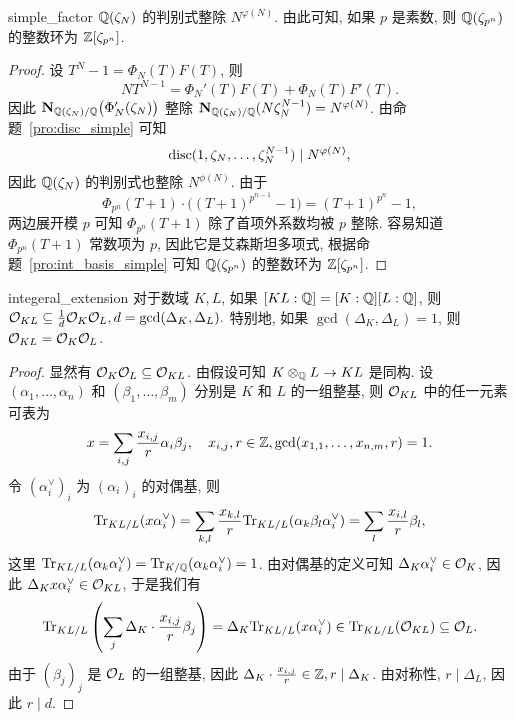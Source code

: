 \begin{proposition}{}{simple_factor}
${\mathbb{Q}}(\zeta_N)$ 的判别式整除 $N^{\varphi(N)}$. 由此可知, 如果 $p$ 是素数, 则 ${\mathbb{Q}}(\zeta_{p^n})$ 的整数环为 ${\mathbb{Z}}[\zeta_{p^n}]$.
\end{proposition}
\begin{proof}
设 $T^N-1=\Phi_N(T)F(T)$, 则
  \[NT^{N-1}=\Phi_N'(T)F(T)+\Phi_N(T)F'(T).\]
因此 ${\mathbf{N}}_{{\mathbb{Q}}(\zeta_N)/{\mathbb{Q}}}\bigl(\Phi'_N(\zeta_N)\bigr)$ 整除 ${\mathbf{N}}_{{\mathbb{Q}}(\zeta_N)/{\mathbb{Q}}}(N\zeta_N^{N-1})=N^{\varphi(N)}$. 由命题~\ref{pro:disc_simple} 可知 
	\[{\mathrm{disc}}(1,\zeta_N,\dots,\zeta_N^{N-1})\mid N^{\varphi(N)},\] 
因此 ${\mathbb{Q}}(\zeta_N)$ 的判别式也整除 $N^{\phi(N)}$. 由于
  \[\Phi_{p^n}(T+1)\cdot \bigl((T+1)^{p^{n-1}}-1\bigr)=(T+1)^{p^n}-1,\]
两边展开模 $p$ 可知 $\Phi_{p^n}(T+1)$ 除了首项外系数均被 $p$ 整除. 容易知道 $\Phi_{p^n}(T+1)$ 常数项为 $p$, 因此它是艾森斯坦多项式, 根据命题~\ref{pro:int_basis_simple} 可知 ${\mathbb{Q}}(\zeta_{p^n})$ 的整数环为 ${\mathbb{Z}}[\zeta_{p^n}]$.
\end{proof}


\begin{lemma}{}{integeral_extension}
对于数域 $K, L$, 如果 $[KL:{\mathbb{Q}}]=[K:{\mathbb{Q}}][L:{\mathbb{Q}}]$, 则 ${\mathcal{O}}_{KL}\subseteq \frac{1}{d}{\mathcal{O}}_K{\mathcal{O}}_L, d=\gcd(\Delta_K,\Delta_L).$ 特别地, 如果 $\gcd(\Delta_K,\Delta_L)=1$, 则 ${\mathcal{O}}_{KL}={\mathcal{O}}_K{\mathcal{O}}_L$.
\end{lemma}
\begin{proof}
显然有 ${\mathcal{O}}_K{\mathcal{O}}_L\subseteq {\mathcal{O}}_{KL}$.
由假设可知 $K\otimes_{\mathbb{Q}} L\to KL$ 是同构. 设 $(\alpha_1,\dots,\alpha_n)$ 和 $(\beta_1,\dots,\beta_m)$ 分别是 $K$ 和 $L$ 的一组整基, 则 ${\mathcal{O}}_{KL}$ 中的任一元素可表为
  \[x=\sum_{i,j}\frac{x_{i,j}}{r}\alpha_i\beta_j,\quad x_{i,j},r\in{\mathbb{Z}}, \gcd(x_{1,1},\dots,x_{n,m},r)=1.\]
令 $(\alpha_i^\vee)_i$ 为 $(\alpha_i)_i$ 的对偶基, 则
  \[{\mathrm{Tr}}_{KL/L}(x\alpha_i^\vee)=\sum_{k,l}\frac{x_{k,l}}{r}{\mathrm{Tr}}_{KL/L}(\alpha_k\beta_l\alpha_i^\vee)
    =\sum_l \frac{x_{i,l}}{r}\beta_l,\]
这里 ${\mathrm{Tr}}_{KL/L}(\alpha_k\alpha_i^\vee)={\mathrm{Tr}}_{K/{\mathbb{Q}}}(\alpha_k\alpha_i^\vee)=1$.
由对偶基的定义可知 $\Delta_K\alpha_i^\vee\in{\mathcal{O}}_K$, 因此 $\Delta_Kx\alpha_i^\vee\in{\mathcal{O}}_{KL}$, 于是我们有
  \[{\mathrm{Tr}}_{KL/L}\left(\sum_j\Delta_K\cdot \frac{x_{i,j}}{r}\beta_j\right)=\Delta_K{\mathrm{Tr}}_{KL/L}(x\alpha_i^\vee)\in{\mathrm{Tr}}_{KL/L}({\mathcal{O}}_{KL})\subseteq{\mathcal{O}}_L.\]
由于 $(\beta_j)_j$ 是 ${\mathcal{O}}_L$ 的一组整基, 因此 $\Delta_K\cdot \frac{x_{i,j}}{r}\in{\mathbb{Z}}, r\mid \Delta_K$. 由对称性, $r\mid \Delta_L$, 因此 $r\mid d$.
\end{proof}

